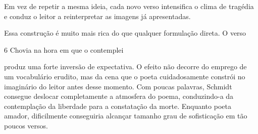 Em vez de repetir a mesma ideia, cada novo verso intensifica o clima de
tragédia e conduz o leitor a reinterpretar as imagens já apresentadas.

Essa construção é muito mais rica do que qualquer formulação direta. O verso

\begin{poemquote}[0.80\textwidth]{6}
  Chovia na hora em que o contemplei
\end{poemquote}

produz uma forte inversão de expectativa. O efeito não decorre do emprego de um
vocabulário erudito, mas da cena que o poeta cuidadosamente constrói no
imaginário do leitor antes desse momento. Com poucas palavras, Schmidt consegue
deslocar completamente a atmosfera do poema, conduzindo-a da contemplação da
liberdade para a constatação da morte. Enquanto poeta amador, dificilmente
conseguiria alcançar tamanho grau de sofisticação em tão poucos versos.
